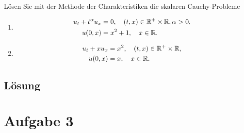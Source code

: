 \documentclass{exercise}
\begin{document}
    \begin{problem}
        Lösen Sie mit der Methode der Charakteristiken die skalaren Cauchy-Probleme
        \begin{enumerate}
            \item
            \begin{align*}
                u_t + t^\alpha u_x &= 0, \quad \parentheses*{t, x} \in \R^+ \times \R, \alpha > 0,\\
                u\parentheses*{0, x} &= x^2 + 1, \quad x \in \R.
            \end{align*}
            \item
            \begin{align*}
                u_t + xu_x &= x^2, \quad \parentheses*{t, x} \in \R^+ \times \R,\\
                u\parentheses*{0, x} &= x, \quad x \in \R.
            \end{align*}
        \end{enumerate}
    \end{problem}
    
    \subsection*{Lösung}


    \section*{Aufgabe 3}
    
\end{document}
